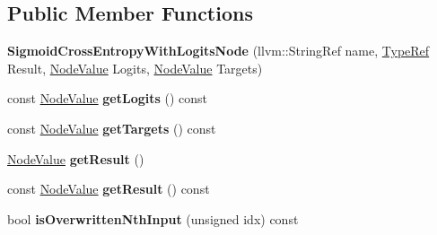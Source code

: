 \subsection*{Public Member Functions}
\begin{DoxyCompactItemize}
\item 
\mbox{\label{classglow_1_1_sigmoid_cross_entropy_with_logits_node_ac1371c7f7010f112b846b51befb898e2}} 
{\bfseries Sigmoid\+Cross\+Entropy\+With\+Logits\+Node} (llvm\+::\+String\+Ref name, \hyperlink{structglow_1_1_type}{Type\+Ref} Result, \hyperlink{structglow_1_1_node_value}{Node\+Value} Logits, \hyperlink{structglow_1_1_node_value}{Node\+Value} Targets)
\item 
\mbox{\label{classglow_1_1_sigmoid_cross_entropy_with_logits_node_a8ab3036b48091605026b05592e05d2cb}} 
const \hyperlink{structglow_1_1_node_value}{Node\+Value} {\bfseries get\+Logits} () const
\item 
\mbox{\label{classglow_1_1_sigmoid_cross_entropy_with_logits_node_a9ade4d34fc22050eeaa7e6c3906c40ab}} 
const \hyperlink{structglow_1_1_node_value}{Node\+Value} {\bfseries get\+Targets} () const
\item 
\mbox{\label{classglow_1_1_sigmoid_cross_entropy_with_logits_node_a0a5b18c8e6e9ba9c710dba464b6a12c2}} 
\hyperlink{structglow_1_1_node_value}{Node\+Value} {\bfseries get\+Result} ()
\item 
\mbox{\label{classglow_1_1_sigmoid_cross_entropy_with_logits_node_a949b9a42a6386a2ce6b998cca7130e8e}} 
const \hyperlink{structglow_1_1_node_value}{Node\+Value} {\bfseries get\+Result} () const
\item 
\mbox{\label{classglow_1_1_sigmoid_cross_entropy_with_logits_node_ad2b5e4e65d76cc38b09da54580b2d9ea}} 
bool {\bfseries is\+Overwritten\+Nth\+Input} (unsigned idx) const
\item 
\mbox{\label{classglow_1_1_sigmoid_cross_entropy_with_logits_node_ac9c7423a6d55bb843837b84d199adeeb}} 

\end{DoxyCompactItemize}
